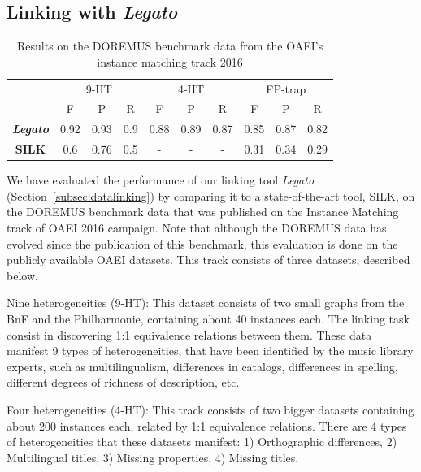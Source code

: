 
\subsection{Linking with \textit{Legato}} \label{sec:eval-link}

\begin{table}[t]
\begin{center}
	\begin{tabular}{|c|c|c|c|c|c|c|c|c|c|}
		\hline
		{}{}{} & \multicolumn{3}{c|}{9-HT} & %
		\multicolumn{3}{c|}{4-HT} &  \multicolumn{3}{c|}{FP-trap}\\
		\cline{2-10}
		& F & P & R & F & P & R & F & P & R \\
		\hline
		\textbf{\textbf{\textit{Legato}}} & 0.92 & 0.93 & 0.9 & 0.88 & 0.89 & 0.87 & 0.85 & 0.87 & 0.82 \\
		\hline
		\textbf{SILK} & 0.6 & 0.76 & 0.5 & - & - & - & 0.31 & 0.34 & 0.29\\
		\hline
	\end{tabular}
	\caption{Results on the DOREMUS benchmark data from the OAEI's instance matching track 2016}
	\label{table:doremus}
\end{center}
\end{table}

We have evaluated the performance of our linking tool \textit{Legato} (Section~\ref{subsec:datalinking}) by comparing it to a state-of-the-art tool, SILK, on the DOREMUS benchmark data that was published on the Instance Matching track of OAEI 2016 campaign. Note that although the DOREMUS data has evolved since the publication of this benchmark, this evaluation is done on the publicly available OAEI datasets. This track consists of three datasets, described below. 

Nine heterogeneities (9-HT): This dataset consists of two small graphs from the BnF and the Philharmonie, containing about 40 instances each. The linking task consist in discovering 1:1 equivalence relations between them. These  data manifest 9 types of heterogeneities, that have been identified by the music library experts, such as multilingualism, differences in catalogs, differences in spelling, different degrees of richness of description, etc.

Four heterogeneities (4-HT): This track consists of two bigger datasets containing about 200 instances each, related by 1:1 equivalence relations. There are 4 types of heterogeneities that these datasets manifest: 1) Orthographic differences, 2) Multilingual titles, 3) Missing properties, 4) Missing titles.

